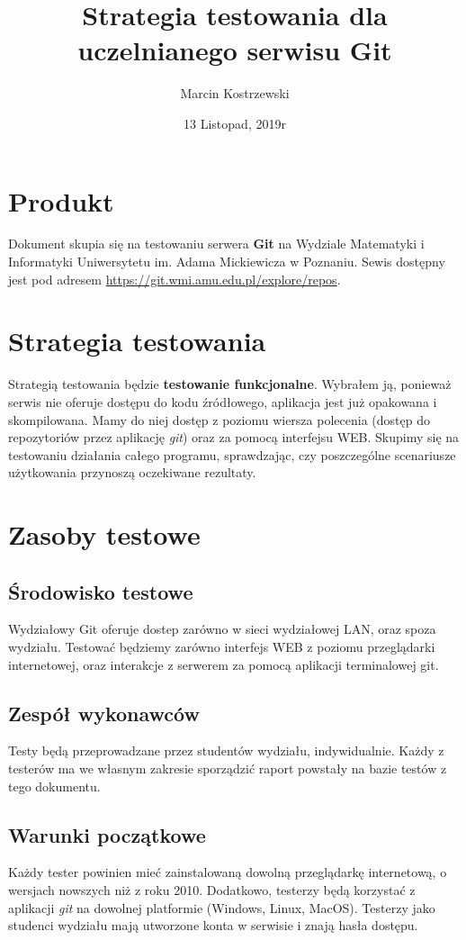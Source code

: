 \documentclass{article}
\title{Strategia testowania dla uczelnianego serwisu Git}
\author{Marcin Kostrzewski}
\date{13 Listopad, 2019r}
\begin{document}
\maketitle
\newpage
\tableofcontents
\newpage

\section{Produkt}
Dokument skupia się na testowaniu serwera \textbf{Git} na Wydziale Matematyki i Informatyki Uniwersytetu im. Adama Mickiewicza w Poznaniu.
Sewis dostępny jest pod adresem \url{https://git.wmi.amu.edu.pl/explore/repos}.


\section{Strategia testowania}
Strategią testowania będzie \textbf{testowanie funkcjonalne}. 
Wybrałem ją, ponieważ serwis nie oferuje dostępu do kodu źródłowego, aplikacja jest już opakowana i skompilowana.
Mamy do niej dostęp z poziomu wiersza polecenia (dostęp do repozytoriów przez aplikację \textit{git})
 oraz za pomocą interfejsu WEB. Skupimy się na testowaniu
działania całego programu, sprawdzając, czy poszczególne scenariusze użytkowania przynoszą oczekiwane
rezultaty.

\section{Zasoby testowe}
\subsection{Środowisko testowe}
Wydziałowy Git oferuje dostep zarówno w sieci wydziałowej LAN, oraz spoza wydziału.
Testować będziemy zarówno interfejs WEB z poziomu przeglądarki internetowej, oraz 
interakcje z serwerem za pomocą aplikacji terminalowej git.

\subsection{Zespół wykonawców}
Testy będą przeprowadzane przez studentów wydziału, indywidualnie. Każdy z testerów
ma we własnym zakresie sporządzić raport powstały na bazie testów z tego dokumentu.

\subsection{Warunki początkowe}
Każdy tester powinien mieć zainstalowaną dowolną przeglądarkę internetową, o wersjach nowszych niż z roku 2010.
Dodatkowo, testerzy będą korzystać z aplikacji \textit{git} na dowolnej platformie (Windows, Linux, MacOS).
\newline
Testerzy jako studenci wydziału mają utworzone konta w serwisie i znają hasła dostępu.
\end{document}
